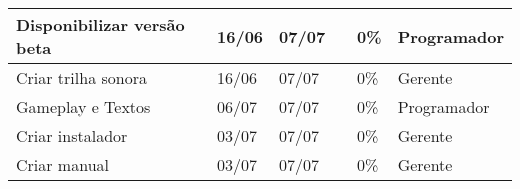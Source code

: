 \documentclass[a4paper, 11pt]{article} %
\begin{document}
\begin{table}[h]
\begin{tabular}{|l|l|l|l|l|l|}
Disponibilizar versão beta                   & 16/06           & 07/07        &                    & 0\%                & Programador          \\ \hline
Criar trilha sonora                          & 16/06           & 07/07        &                    & 0\%                & Gerente              \\ \hline
Gameplay e Textos                            & 06/07           & 07/07        &                    & 0\%                & Programador          \\ \hline
Criar instalador                             & 03/07           & 07/07        &                    & 0\%                & Gerente              \\ \hline
Criar manual                                 & 03/07           & 07/07        &                    & 0\%                & Gerente              \\ \hline

\end{tabular}
\end{table}
\end{document}
